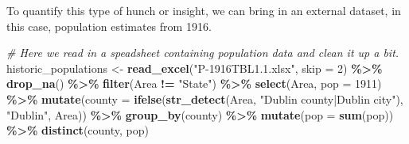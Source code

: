 \documentclass[
]{article}
\newenvironment{Shaded}{\begin{snugshade}}{\end{snugshade}}
\newcommand{\AttributeTok}[1]{\textcolor[rgb]{0.13,0.29,0.53}{#1}}
\newcommand{\CommentTok}[1]{\textcolor[rgb]{0.56,0.35,0.01}{\textit{#1}}}
\newcommand{\DecValTok}[1]{\textcolor[rgb]{0.00,0.00,0.81}{#1}}
\newcommand{\FunctionTok}[1]{\textcolor[rgb]{0.13,0.29,0.53}{\textbf{#1}}}
\newcommand{\NormalTok}[1]{#1}
\newcommand{\OtherTok}[1]{\textcolor[rgb]{0.56,0.35,0.01}{#1}}
\newcommand{\SpecialCharTok}[1]{\textcolor[rgb]{0.81,0.36,0.00}{\textbf{#1}}}
\newcommand{\StringTok}[1]{\textcolor[rgb]{0.31,0.60,0.02}{#1}}
\begin{document}
To quantify this type of hunch or insight, we can bring in an external
dataset, in this case, population estimates from 1916.

\begin{Shaded}
\begin{Highlighting}[]
\CommentTok{\# Here we read in a speadsheet containing population data and clean it up a bit.}
\NormalTok{historic\_populations }\OtherTok{\textless{}{-}} \FunctionTok{read\_excel}\NormalTok{(}\StringTok{"P{-}1916TBL1.1.xlsx"}\NormalTok{, }\AttributeTok{skip =} \DecValTok{2}\NormalTok{) }\SpecialCharTok{\%\textgreater{}\%} \FunctionTok{drop\_na}\NormalTok{() }\SpecialCharTok{\%\textgreater{}\%}
  \FunctionTok{filter}\NormalTok{(Area }\SpecialCharTok{!=} \StringTok{"State"}\NormalTok{) }\SpecialCharTok{\%\textgreater{}\%} \FunctionTok{select}\NormalTok{(Area, }\AttributeTok{pop =} \StringTok{\textasciigrave{}}\AttributeTok{1911}\StringTok{\textasciigrave{}}\NormalTok{) }\SpecialCharTok{\%\textgreater{}\%}
  \FunctionTok{mutate}\NormalTok{(}\AttributeTok{county =} \FunctionTok{ifelse}\NormalTok{(}\FunctionTok{str\_detect}\NormalTok{(Area, }\StringTok{"Dublin county|Dublin city"}\NormalTok{), }\StringTok{"Dublin"}\NormalTok{, Area)) }\SpecialCharTok{\%\textgreater{}\%}
  \FunctionTok{group\_by}\NormalTok{(county) }\SpecialCharTok{\%\textgreater{}\%} \FunctionTok{mutate}\NormalTok{(}\AttributeTok{pop =} \FunctionTok{sum}\NormalTok{(pop)) }\SpecialCharTok{\%\textgreater{}\%} \FunctionTok{distinct}\NormalTok{(county, pop)}


\end{Highlighting}
\end{Shaded}
\end{document}
